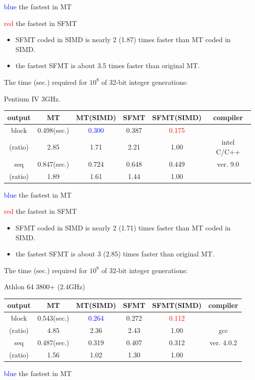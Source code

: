 \documentclass[a4j,12pt,landscape]{jarticle}
\begin{document}
\textcolor{blue}{blue} the fastest in MT

\textcolor{red}{red} the fastest in SFMT
\begin{itemize}
  \item SFMT coded in SIMD is nearly 2 (1.87) times faster than MT
 coded in SIMD.
  \item the fastest SFMT is about 3.5 times faster than original MT.
\end{itemize}
\newpage
\begin{center}
The time (sec.) required for $10^8$ 
of 32-bit integer generations:

Pentium IV 3GHz. 

\vskip 2mm
\begin{tabular}{|c||c|c|c|c|c|}
\hline
output & MT & MT{\Large(SIMD)} & SFMT & SFMT{\Large (SIMD)} & compiler
\\ \hline \hline
 block & 0.498(sec.) & \textcolor{blue}{0.300}
 & 0.387 & \textcolor{red}{0.175} & \\ \cline{2-5}
(ratio)& 2.85\phantom{0} & 1.71\phantom{0}  & 2.21\phantom{0}
  & 1.00\phantom{0}  & intel C/C++\\ \cline{1-5}
 seq   & 0.847(sec.) & 0.724 & 0.648 & 0.449 & ver. 9.0 \\\cline{2-5}
(ratio)& 1.89\phantom{0} & 1.61\phantom{0}  & 1.44\phantom{0}
  & 1.00\phantom{0}  &  \\ \hline
\end{tabular}
\end{center}
\textcolor{blue}{blue} the fastest in MT

\textcolor{red}{red} the fastest in SFMT
\begin{itemize}
  \item SFMT coded in SIMD is nearly 2 (1.71) times faster than MT
 coded in SIMD.
  \item the fastest SFMT is about 3 (2.85) times faster than original MT.
\end{itemize}

\newpage
\begin{center}
The time (sec.) required for $10^8$ 
of 32-bit integer generations:

Athlon 64 3800+ (2.4GHz)

\vskip 2mm
\begin{tabular}{|c||c|c|c|c|c|}
\hline
output & MT & MT{\Large(SIMD)} & SFMT & SFMT{\Large (SIMD)} & compiler
\\ \hline \hline
block & 0.543(sec.) & \textcolor{blue}{0.264}
 & 0.272 & \textcolor{red}{0.112} & \phantom{intel C/C++}\\
 \cline{2-5}
(ratio)& 4.85\phantom{0} & 2.36\phantom{0}  & 2.43\phantom{0} & 1.00\phantom{0} & gcc \\ \cline{1-5}
seq & 0.487(sec.) & 0.319 & 0.407 & 0.312 & ver. 4.0.2\\ \cline{2-5}
(ratio)& 1.56\phantom{0} & 1.02\phantom{0}  & 1.30\phantom{0} & 1.00\phantom{0} & \\ \hline
\end{tabular}
\end{center}
\textcolor{blue}{blue} the fastest in MT
\end{document}
